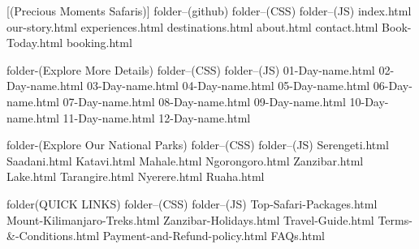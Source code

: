 [(Precious Moments Safaris)]
     folder--(github)
     folder--(CSS)
     folder--(JS)
     index.html
     our-story.html
     experiences.html
     destinations.html
     about.html
     contact.html
     {Book-Today.html}
     {booking.html}

    folder-(Explore More Details)
         folder--(CSS)
         folder--(JS)
         01-Day-name.html
         02-Day-name.html
         03-Day-name.html
         04-Day-name.html
         05-Day-name.html
         06-Day-name.html
         07-Day-name.html
         08-Day-name.html
         09-Day-name.html
         10-Day-name.html
         11-Day-name.html
         12-Day-name.html

         
    folder-(Explore Our National Parks)
         folder--(CSS)
         folder--(JS)
         Serengeti.html
         Saadani.html
         Katavi.html
         Mahale.html
         Ngorongoro.html
         Zanzibar.html
         Lake.html
         Tarangire.html
         Nyerere.html
         Ruaha.html
            
          
    folder(QUICK LINKS)
          folder--(CSS)
          folder--(JS)
          Top-Safari-Packages.html
          Mount-Kilimanjaro-Treks.html
          Zanzibar-Holidays.html
          Travel-Guide.html
          Terms-&-Conditions.html
          Payment-and-Refund-policy.html
          FAQs.html

